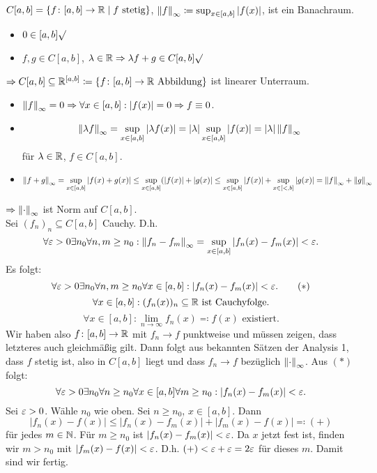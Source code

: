 \begin{beispiel}
	$ C[a,b]=\lbrace f\colon[a,b]\rightarrow\mathbb{R}\mid f\text{ stetig}\rbrace $, $ \left\|f\right\|_\infty\coloneqq\sup_{x\in[a,b]}|f(x)| $, ist ein Banachraum.
	\begin{beweis}
		\begin{itemize}
			\item $ 0\in[a,b]\surd $
			\item $ f,g\in C[a,b] $, $ \lambda\in\mathbb{R} \Rightarrow\lambda f+g\in C[a,b]\surd$
		\end{itemize}
		$ \Rightarrow C[a,b]\subseteq\mathbb{R}^{[a,b]}\coloneqq\lbrace f\colon[a,b]\rightarrow\mathbb{R}\text{ Abbildung}\rbrace $ ist linearer Unterraum.
		\begin{itemize}
			\item $ \left\|f\right\|_\infty=0\Rightarrow\forall x\in[a,b]:|f(x)|=0\Rightarrow f\equiv 0 $.
			\item \[ \left\|\lambda f\right\|_\infty=\sup_{x\in[a,b]}|\lambda f(x)|=|\lambda|\sup_{x\in[a,b]}|f(x)|=|\lambda|\left\|f\right\|_\infty \]
			f\"ur $ \lambda\in\mathbb{R} $, $ f\in C[a,b] $.
			\item \[ \left\|f+g\right\|_\infty=\sup_{x\in[a,b]}|f(x)+g(x)|\leq\sup_{x\in[a,b]}(|f(x)|+|g(x)|\leq\sup_{x\in[a,b]}|f(x)|+\sup_{x\in[<,b]}|g(x)|=\left\|f\right\|_\infty+\left\|g\right\|_\infty \]
		\end{itemize}
		$ \Rightarrow\left\|\cdot\right\|_\infty $ ist Norm auf $ C[a,b] $.\\
		Sei $ (f_n)_n\subseteq C[a,b] $ Cauchy. D.h.
		\[ \forall\varepsilon>0\exists n_0\forall n,m\geq n_0:\left\|f_n-f_m\right\|_\infty=\sup_{x\in[a,b]}|f_n(x)-f_m(x)|<\varepsilon. \]
		Es folgt:
		\[ \forall\varepsilon>0\exists n_0\forall n,m\geq n_0\forall x\in[a,b]:|f_n(x)-f_m(x)|<\varepsilon.\qquad (\ast) \]
		\[ \forall x\in[a,b]:(f_n(x))_n\subseteq\mathbb{R}\text{ ist Cauchyfolge.} \]
		\[ \forall x\in[a,b]:\lim_{n\to\infty}f_n(x)\eqqcolon f(x)\text{ existiert.} \]
		Wir haben also $ f\colon[a,b]\rightarrow\mathbb{R} $ mit $ f_n\to f $ punktweise und m\"ussen zeigen, dass letzteres auch gleichm\"a\ss ig gilt. Dann folgt aus bekannten S\"atzen der Analysis 1, dass $ f $ stetig ist, also in $ C[a,b] $ liegt und dass $ f_n\to f $ bez\"uglich $ \left\|\cdot\right\|_\infty $.
		Aus $ (\ast) $ folgt:
		\[ \forall\varepsilon>0\exists n_0\forall n\geq n_0\forall x\in[a,b]\forall m\geq n_0:|f_n(x)-f_m(x)|<\varepsilon. \]
		Sei $ \varepsilon>0 $. W\"ahle $ n_0 $ wie oben. Sei $ n\geq n_0 $, $ x\in[a,b] $. Dann
		\[ |f_n(x)-f(x)|\leq|f_n(x)-f_m(x)|+|f_m(x)-f(x)|\eqqcolon(+) \] f\"ur jedes $ m\in\mathbb{N} $. F\"ur $ m\geq n_0 $ ist $ |f_n(x)-f_m(x)|<\varepsilon $. Da $ x $ jetzt fest ist, finden wir $ m>n_0 $ mit $ |f_{m}(x)-f(x)|<\varepsilon $. D.h. $ (+)<\varepsilon+\varepsilon=2\varepsilon $ f\"ur dieses $ m $. Damit sind wir fertig.
\end{beweis}
\end{beispiel}